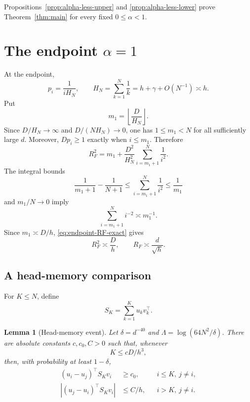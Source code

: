 \documentclass[11pt]{article}
\newtheorem{lemma}[theorem]{Lemma}
\theoremstyle{remark}
\newcommand{\1}{\mathbf 1}
\begin{document}
Propositions~\ref{prop:alpha-less-upper} and
\ref{prop:alpha-less-lower} prove Theorem~\ref{thm:main} for every
fixed $0\leq\alpha<1$.

\section{The endpoint $\alpha=1$}

At the endpoint,
\[
 p_i=\frac1{iH_N},
 \qquad
 H_N=\sum_{k=1}^N\frac1k
 =h+\gamma+O(N^{-1})\asymp h.
\]
Put
\[
 m_1=\left\lfloor\frac{D}{H_N}\right\rfloor.
\]
Since $D/H_N\to\infty$ and $D/(NH_N)\to0$, one has
$1\leq m_1<N$ for all sufficiently large $d$.  Moreover,
$Dp_i\geq1$ exactly when $i\leq m_1$.  Therefore
\begin{equation}
 R_F^2
 =m_1+\frac{D^2}{H_N^2}\sum_{i=m_1+1}^N\frac1{i^2}.
 \label{eq:endpoint-RF-exact}
\end{equation}
The integral bounds
\[
 \frac1{m_1+1}-\frac1{N+1}
 \leq\sum_{i=m_1+1}^N\frac1{i^2}
 \leq\frac1{m_1}
\]
and $m_1/N\to0$ imply
\[
 \sum_{i=m_1+1}^N i^{-2}\asymp m_1^{-1}.
\]
Since $m_1\asymp D/h$, \eqref{eq:endpoint-RF-exact} gives
\begin{equation}
 R_F^2\asymp\frac Dh,
 \qquad
 R_F\asymp\frac d{\sqrt h}.
 \label{eq:endpoint-scale}
\end{equation}

\subsection{A head-memory comparison}

For $K\leq N$, define
\[
 S_K=\sum_{k=1}^K u_kv_k^\top.
\]

\begin{lemma}[Head-memory event]
\label{lem:head-memory}
Let $\delta=d^{-40}$ and
$\Lambda=\log(64N^2/\delta)$.  There are absolute constants
$c,c_0,C>0$ such that, whenever
\[
 K\leq cD/h^3,
\]
then, with probability at least $1-\delta$,
\begin{align}
 (u_i-u_j)^\top S_Kv_i&\geq c_0,
 &&i\leq K,\ j\neq i,
 \label{eq:head-margin}\\
 |(u_j-u_i)^\top S_Kv_i|&\leq C/h,
 &&i>K,\ j\neq i.
 \label{eq:tail-logit}
\end{align}
\end{lemma}
\end{document}
